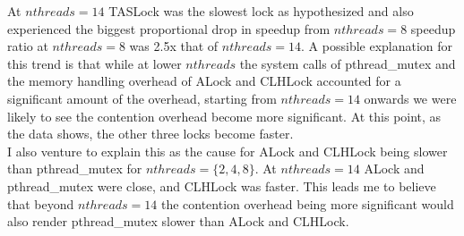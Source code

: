 \documentclass{article}
\begin{document}
\begin{adjustwidth}{-2cm}{-2cm}
At $nthreads=14$ TASLock was the slowest lock as hypothesized and also experienced the biggest proportional drop in speedup from $nthreads=8$\; speedup ratio at $nthreads=8$ was 2.5x that of $nthreads=14$. A possible explanation for this trend is that while at lower $nthreads$ the system calls of pthread\_mutex and the memory handling overhead of ALock and CLHLock accounted for a significant amount of the overhead, starting from $nthreads=14$ onwards we were likely to see the contention overhead become more significant. At this point, as the data shows, the other three locks become faster.\\
I also venture to explain this as the cause for ALock and CLHLock being slower than pthread\_mutex for $nthreads = \{2,4,8\}$. At $nthreads=14$ ALock and pthread\_mutex were close, and CLHLock was faster. This leads me to believe that beyond $nthreads=14$ the contention overhead being more significant would also render pthread\_mutex slower than ALock and CLHLock.\\

\end{adjustwidth}
\end{document}
